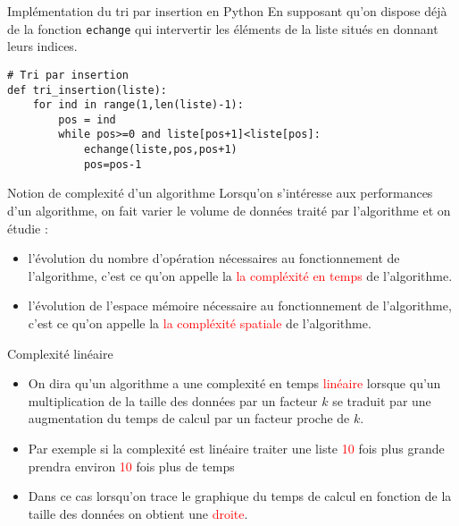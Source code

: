 \documentclass[10pt]{beamer}
\begin{document}
\begin{frame}[fragile]
	\mframe{\Algotris}
	\begin{block}{Implémentation du tri par insertion en Python}
		En supposant qu'on dispose déjà de  la fonction \texttt{echange} qui intervertir les éléments de la liste situés en donnant leurs indices.
		\begin{lstlisting}
# Tri par insertion
def tri_insertion(liste):
    for ind in range(1,len(liste)-1):
        pos = ind
        while pos>=0 and liste[pos+1]<liste[pos]:
            echange(liste,pos,pos+1)
            pos=pos-1
\end{lstlisting}
	\end{block}
\end{frame}


\begin{frame}
	\mframe{\Algotris}
	\begin{block}{Notion de complexité d'un algorithme}
		Lorsqu'on s'intéresse aux performances d'un algorithme, on fait varier le volume de données traité par l'algorithme et on étudie :
		\begin{itemize}
			\item<2-> l'évolution du nombre d'opération nécessaires au fonctionnement de l'algorithme, c'est ce qu'on appelle la \textcolor{red}{la compléxité en temps} de l'algorithme.
			\item<3-> l'évolution de l'espace mémoire nécessaire au fonctionnement de l'algorithme, c'est ce qu'on appelle la \textcolor{red}{la compléxité spatiale} de l'algorithme.
		\end{itemize}
	\end{block}
\end{frame}

\begin{frame}
	\mframe{\Algotris}
	\begin{block}{Complexité linéaire}
		\begin{itemize}
			\item<2-> On dira qu'un algorithme a une complexité en temps \textcolor{red}{linéaire} lorsque qu'un multiplication de la taille des données par un facteur $k$ se traduit par une augmentation du temps de calcul par un facteur proche de $k$.
			\item<3-> Par exemple si la complexité est linéaire traiter une liste \textcolor{red}{10} fois plus grande prendra environ \textcolor{red}{10} fois plus de temps
			\item<4-> Dans ce cas lorsqu'on trace le graphique du temps de calcul en fonction de la taille des données on obtient une \textcolor{red}{droite}.
		\end{itemize}
	\end{block}
\end{frame}
\end{document}
